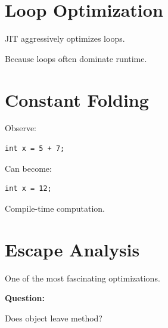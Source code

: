 \documentclass[11pt,a4paper]{book}
\begin{document}
\section{Loop Optimization}

JIT aggressively optimizes loops.


Because loops often dominate runtime.


\section{Constant Folding}

Observe:

\begin{verbatim} 
int x = 5 + 7;
\end{verbatim}


Can become:

\begin{verbatim} 
int x = 12;
\end{verbatim}


Compile-time computation.


\section{Escape Analysis}

One of the most fascinating
optimizations.


\textbf{Question:}


Does object leave method?
\end{document}
